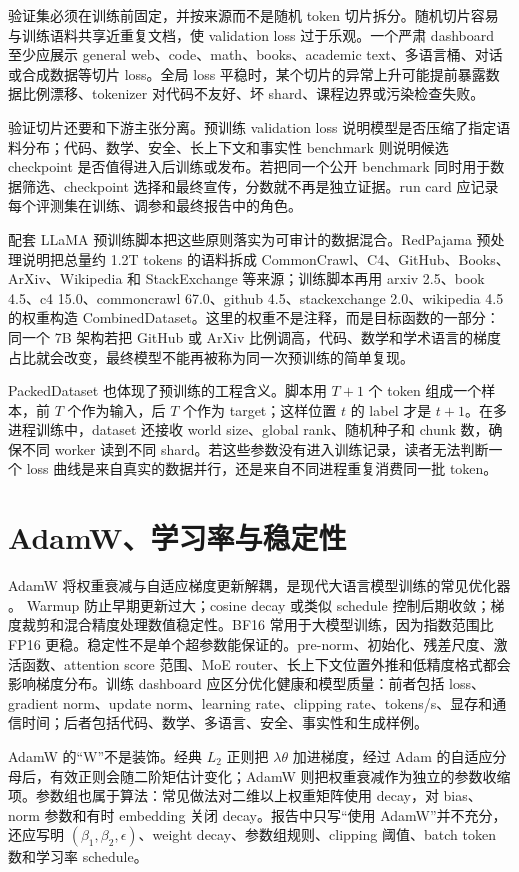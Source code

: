 \documentclass[UTF8,zihao=-4,openany]{ctexbook}
\begin{document}
验证集必须在训练前固定，并按来源而不是随机 token 切片拆分。随机切片容易与训练语料共享近重复文档，使 validation loss 过于乐观。一个严肃 dashboard 至少应展示 general web、code、math、books、academic text、多语言桶、对话或合成数据等切片 loss。全局 loss 平稳时，某个切片的异常上升可能提前暴露数据比例漂移、tokenizer 对代码不友好、坏 shard、课程边界或污染检查失败。

验证切片还要和下游主张分离。预训练 validation loss 说明模型是否压缩了指定语料分布；代码、数学、安全、长上下文和事实性 benchmark 则说明候选 checkpoint 是否值得进入后训练或发布。若把同一个公开 benchmark 同时用于数据筛选、checkpoint 选择和最终宣传，分数就不再是独立证据。run card 应记录每个评测集在训练、调参和最终报告中的角色。

配套 LLaMA 预训练脚本把这些原则落实为可审计的数据混合。RedPajama 预处理说明把总量约 1.2T tokens 的语料拆成 CommonCrawl、C4、GitHub、Books、ArXiv、Wikipedia 和 StackExchange 等来源；训练脚本再用 arxiv 2.5、book 4.5、c4 15.0、commoncrawl 67.0、github 4.5、stackexchange 2.0、wikipedia 4.5 的权重构造 CombinedDataset。这里的权重不是注释，而是目标函数的一部分：同一个 7B 架构若把 GitHub 或 ArXiv 比例调高，代码、数学和学术语言的梯度占比就会改变，最终模型不能再被称为同一次预训练的简单复现。

PackedDataset 也体现了预训练的工程含义。脚本用 $T+1$ 个 token 组成一个样本，前 $T$ 个作为输入，后 $T$ 个作为 target；这样位置 $t$ 的 label 才是 $t+1$。在多进程训练中，dataset 还接收 world size、global rank、随机种子和 chunk 数，确保不同 worker 读到不同 shard。若这些参数没有进入训练记录，读者无法判断一个 loss 曲线是来自真实的数据并行，还是来自不同进程重复消费同一批 token。

\section{AdamW、学习率与稳定性}
AdamW 将权重衰减与自适应梯度更新解耦，是现代大语言模型训练的常见优化器 \cite{loshchilov2019decoupled}。 Warmup 防止早期更新过大；cosine decay 或类似 schedule 控制后期收敛；梯度裁剪和混合精度处理数值稳定性。BF16 常用于大模型训练，因为指数范围比 FP16 更稳。稳定性不是单个超参数能保证的。pre-norm、初始化、残差尺度、激活函数、attention score 范围、MoE router、长上下文位置外推和低精度格式都会影响梯度分布。训练 dashboard 应区分优化健康和模型质量：前者包括 loss、gradient norm、update norm、learning rate、clipping rate、tokens/s、显存和通信时间；后者包括代码、数学、多语言、安全、事实性和生成样例。

AdamW 的“W”不是装饰。经典 $L_2$ 正则把 $\lambda\theta$ 加进梯度，经过 Adam 的自适应分母后，有效正则会随二阶矩估计变化；AdamW 则把权重衰减作为独立的参数收缩项。参数组也属于算法：常见做法对二维以上权重矩阵使用 decay，对 bias、norm 参数和有时 embedding 关闭 decay。报告中只写“使用 AdamW”并不充分，还应写明 $(\beta_1,\beta_2,\epsilon)$、weight decay、参数组规则、clipping 阈值、batch token 数和学习率 schedule。
\end{document}
